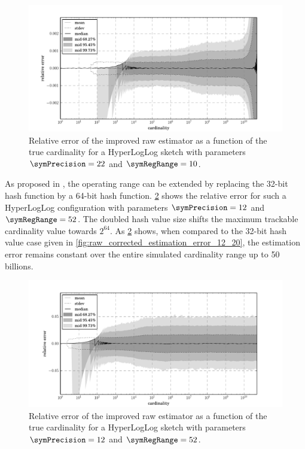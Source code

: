 \documentclass[a4paper]{scrartcl}
\begin{document}
\begin{figure}
\centering
\includegraphics[width=1\textwidth]{raw_corrected_estimate_22_10}
\caption{Relative error of the improved raw estimator as a function of the true cardinality for a HyperLogLog sketch with parameters $\symPrecision = 22$ and $\symRegRange=10$.}
\label{fig:raw_corrected_estimation_error_22_10}
\end{figure}

As proposed in \cite{Heule2013}, the operating range can be extended by
replacing the 32-bit hash function by a 64-bit hash function. \cref{fig:raw_corrected_estimation_error_12_52} shows the relative error for such a HyperLogLog configuration with parameters $\symPrecision=12$ and $\symRegRange=52$. The doubled hash value size shifts the maximum trackable cardinality value towards $2^{64}$. As \cref{fig:raw_corrected_estimation_error_12_52} shows, when compared to the 32-bit hash value case given in \cref{fig:raw_corrected_estimation_error_12_20}, the estimation error remains constant over the entire simulated cardinality range up to 50 billions.

\begin{figure}
\centering
\includegraphics[width=1\textwidth]{raw_corrected_estimate_12_52}
\caption{Relative error of the improved raw estimator as a function of the true cardinality for a HyperLogLog sketch with parameters $\symPrecision = 12$ and $\symRegRange=52$.}
\label{fig:raw_corrected_estimation_error_12_52}
\end{figure}
\end{document}
